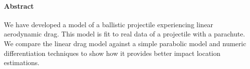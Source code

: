 \paragraph{Abstract} We have developed a model of a ballistic projectile experiencing linear aerodynamic drag. This model is fit to real data of a projectile with a parachute. We compare the linear drag model against a simple parabolic model and numeric differentiation techniques to show how it provides better impact location estimations.